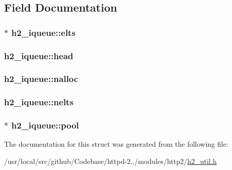 \subsection{Field Documentation}
\subsubsection[{\texorpdfstring{elts}{elts}}]{$\ast$ h2\+\_\+iqueue\+::elts}\hypertarget{structh2__iqueue_a8fcc1a7ee4f72bda8c6e5a34a388708e}{}\label{structh2__iqueue_a8fcc1a7ee4f72bda8c6e5a34a388708e}
\subsubsection[{\texorpdfstring{head}{head}}]{ h2\+\_\+iqueue\+::head}\hypertarget{structh2__iqueue_a1d90810fdddd2635042a27eab2f1c449}{}\label{structh2__iqueue_a1d90810fdddd2635042a27eab2f1c449}
\subsubsection[{\texorpdfstring{nalloc}{nalloc}}]{ h2\+\_\+iqueue\+::nalloc}\hypertarget{structh2__iqueue_ae1c200c70ebbcb1b64a77a608535966a}{}\label{structh2__iqueue_ae1c200c70ebbcb1b64a77a608535966a}
\subsubsection[{\texorpdfstring{nelts}{nelts}}]{ h2\+\_\+iqueue\+::nelts}\hypertarget{structh2__iqueue_a1416b7b9170158f3bc75bee34f926e2d}{}\label{structh2__iqueue_a1416b7b9170158f3bc75bee34f926e2d}
\subsubsection[{\texorpdfstring{pool}{pool}}]{$\ast$ h2\+\_\+iqueue\+::pool}\hypertarget{structh2__iqueue_a3116560ab576462ef903945181fd16c6}{}\label{structh2__iqueue_a3116560ab576462ef903945181fd16c6}


The documentation for this struct was generated from the following file\+:\begin{DoxyCompactItemize}
\item 
/usr/local/src/github/\+Codebase/httpd-\/2../modules/http2/\hyperlink{h2__util_8h}{h2\+\_\+util.\+h}\end{DoxyCompactItemize}

